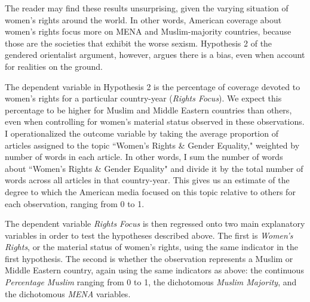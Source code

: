 \documentclass[11pt, oneside]{article}
\begin{document}
The reader may find these results unsurprising, given the varying situation of women's rights around the world. In other words, American coverage about women's rights focus more on MENA and Muslim-majority countries, because those are the societies that exhibit the worse sexism. Hypothesis 2 of the gendered orientalist argument, however, argues there is a bias, even when account for realities on the ground.

The dependent variable in Hypothesis 2 is the percentage of coverage devoted to women's rights for a particular country-year (\emph{Rights Focus}). We expect this percentage to be higher for Muslim and Middle Eastern countries than others, even when controlling for women's material status observed in these observations. I operationalized the outcome variable by taking the average proportion of articles assigned to the topic ``Women's Rights \& Gender Equality," weighted by number of words in each article. In other words, I sum the number of words about ``Women's Rights \& Gender Equality" and divide it by the total number of words across all articles in that country-year.  This gives us an estimate of the degree to which the American media focused on this topic relative to others for each observation, ranging from 0 to 1.

The dependent variable \emph{Rights Focus} is then regressed onto two main explanatory variables in order to test the hypotheses described above. The first is \emph{Women's Rights}, or the material status of women's rights, using the same indicator in the first hypothesis. The second is whether the observation represents a Muslim or Middle Eastern country, again using the same indicators as above: the continuous \emph{Percentage Muslim} ranging from 0 to 1, the dichotomous \emph{Muslim Majority}, and the dichotomous \emph{MENA} variables. 
\end{document}
